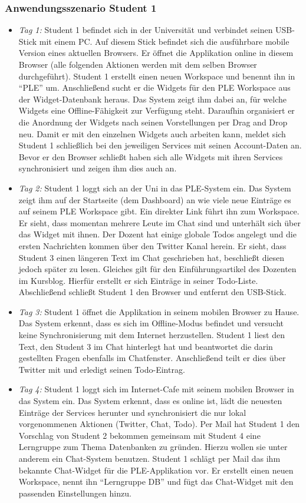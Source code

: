 \subsubsection*{Anwendungsszenario Student 1}
\begin{itemize}
 \item \emph{Tag 1:} Student 1 befindet sich in der Universität und verbindet seinen USB-Stick mit einem PC. Auf diesem Stick befindet sich die ausführbare mobile Version eines aktuellen Browsers. Er öffnet die Applikation online in diesem Browser (alle folgenden Aktionen werden mit dem selben Browser durchgeführt). Student 1 erstellt einen neuen Workspace und benennt ihn in "`PLE"' um. Anschließend sucht er die Widgets für den PLE Workspace aus der Widget-Datenbank heraus. Das System zeigt ihm dabei an, für welche Widgets eine Offline-Fähigkeit zur Verfügung steht. Daraufhin organisiert er die Anordnung der Widgets nach seinen Vorstellungen per Drag and Drop neu. Damit er mit den einzelnen Widgets auch arbeiten kann, meldet sich Student 1 schließlich bei den jeweiligen Services mit seinen Account-Daten an. Bevor er den Browser schließt haben sich alle Widgets mit ihren Services synchronisiert und zeigen ihm dies auch an.
 \item \emph{Tag 2:} Student 1 loggt sich an der Uni in das PLE-System ein. Das System zeigt ihm auf der Startseite (dem Dashboard) an wie viele neue Einträge es auf seinem PLE Workspace gibt. Ein direkter Link führt ihn zum Workspace. Er sieht, dass momentan mehrere Leute im Chat sind und unterhält sich über das Widget mit ihnen. Der Dozent hat einige globale Todos angelegt und die ersten Nachrichten kommen über den Twitter Kanal herein. Er sieht, dass Student 3 einen längeren Text im Chat geschrieben hat, beschließt diesen jedoch später zu lesen. Gleiches gilt für den Einführungsartikel des Dozenten im Kursblog. Hierfür erstellt er sich Einträge in seiner Todo-Liste. Abschließend schließt Student 1 den Browser und entfernt den USB-Stick.
 \item \emph{Tag 3:} Student 1 öffnet die Applikation in seinem mobilen Browser zu Hause. Das System erkennt, dass es sich im Offline-Modus befindet und versucht keine Synchronisierung mit dem Internet herzustellen. Student 1 liest den Text, den Student 3 im Chat hinterlegt hat und beantwortet die darin gestellten Fragen ebenfalls im Chatfenster. Anschließend teilt er dies über Twitter mit und erledigt seinen Todo-Eintrag.
 \item \emph{Tag 4:} Student 1 loggt sich im Internet-Cafe mit seinem mobilen Browser in das System ein. Das System erkennt, dass es online ist, lädt die neuesten Einträge der Services herunter und synchronisiert die nur lokal vorgenommenen Aktionen (Twitter, Chat, Todo). Per Mail hat Student 1 den Vorschlag von Student 2 bekommen gemeinsam mit Student 4 eine Lerngruppe zum Thema Datenbanken zu gründen. Hierzu wollen sie unter anderem ein Chat-System benutzen. Student 1 schlägt per Mail das ihm bekannte Chat-Widget für die PLE-Applikation vor. Er erstellt einen neuen Workspace, nennt ihn “Lerngruppe DB” und fügt das Chat-Widget mit den passenden Einstellungen hinzu.

\end{itemize}
